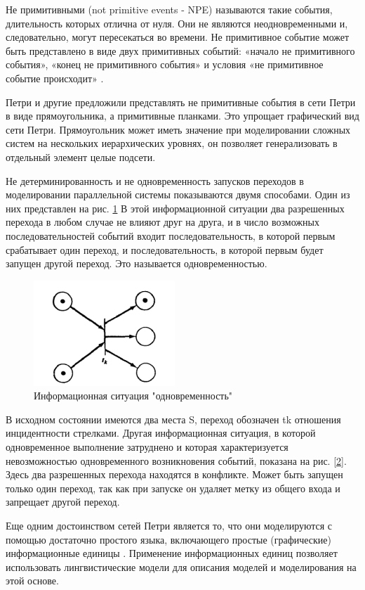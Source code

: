 Не примитивными (not primitive events - NPE) называются такие события, длительность которых отлична от нуля. Они не являются неодновременными и, следовательно, могут пересекаться во времени. Не примитивное событие может быть представлено в виде двух примитивных событий: «начало не примитивного события», «конец не примитивного события» и условия «не примитивное событие происходит» \cite{Ghanem}.

Петри и другие \cite{Meldman}\cite{Kulagin}\cite{Peterson}\cite{Ghanem} предложили представлять не примитивные события в сети Петри в виде прямоугольника, а примитивные планками. Это упрощает графический вид сети Петри. Прямоугольник может иметь значение при моделировании сложных систем на нескольких иерархических уровнях, он позволяет генерализовать в отдельный элемент целые подсети.

Не детерминированность и не одновременность запусков переходов в моделировании параллельной системы показываются двумя способами. Один из них представлен на рис. \ref{fig1} В этой информационной ситуации два разрешенных перехода в любом случае не влияют друг на друга, и в число возможных последовательностей событий входит последовательность, в которой первым срабатывает один переход, и последовательность, в которой первым будет запущен другой переход. Это называется одновременностью.

\begin{figure}[ht]
\centerline{\includegraphics[width=0.3\linewidth]{images/image1.png}}
\caption{Информационная ситуация "одновременность"}
\label{fig1}
\end{figure}

В исходном состоянии имеются два места S, переход обозначен tk отношения инцидентности стрелками. Другая информационная ситуация, в которой одновременное выполнение затруднено и которая характеризуется невозможностью одновременного возникновения событий, показана на рис. \ref{2}. Здесь два разрешенных перехода находятся в конфликте. Может быть запущен только один переход, так как при запуске он удаляет метку из общего входа и запрещает другой переход.

Еще одним достоинством сетей Петри является то, что они моделируются с помощью достаточно простого языка, включающего простые (графические) информационные единицы \cite{Ghanem}. Применение информационных единиц \cite{Tsvetkov3} позволяет использовать лингвистические модели для описания моделей и моделирования на этой основе.


